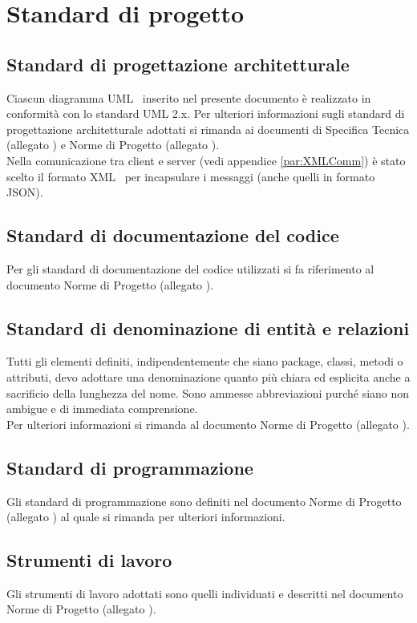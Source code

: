 \section{Standard di progetto}{
    \subsection{Standard di progettazione architetturale}	{
	Ciascun diagramma UML\g~ inserito nel presente documento è realizzato in conformità con lo standard UML 2.x. Per ulteriori informazioni sugli standard di progettazione architetturale adottati si rimanda ai documenti di Specifica Tecnica (allegato \textit{\SpecificaTecnica}) e Norme di Progetto (allegato \textit{\NormeDiProgetto}).\\
	Nella comunicazione tra client e server (vedi appendice \ref{par:XMLComm}) è stato scelto il formato XML\g~ per incapsulare i messaggi (anche quelli in formato JSON\g ). 
    }
    
	\subsection{Standard di documentazione del codice}{
	Per gli standard di documentazione del codice utilizzati si fa riferimento al documento Norme di Progetto (allegato \textit{\NormeDiProgetto}).
	}
	
	\subsection{Standard di denominazione di entità e relazioni}{
	Tutti gli elementi definiti, indipendentemente che siano package, classi, metodi o attributi, devo adottare una denominazione quanto più chiara ed esplicita anche a sacrificio della lunghezza del nome. Sono ammesse abbreviazioni purché siano non ambigue e di immediata comprensione.\\
	Per ulteriori informazioni si rimanda al documento Norme di Progetto (allegato \textit{\NormeDiProgetto}).
	}
	
	\subsection{Standard di programmazione}{
	Gli standard di programmazione sono definiti nel documento Norme di Progetto (allegato \textit{\NormeDiProgetto}) al quale si rimanda per ulteriori informazioni.
	}
	
	\subsection{Strumenti di lavoro}{
	Gli strumenti di lavoro adottati sono quelli individuati e descritti nel documento Norme di Progetto (allegato \textit{\NormeDiProgetto}).
	}
}
